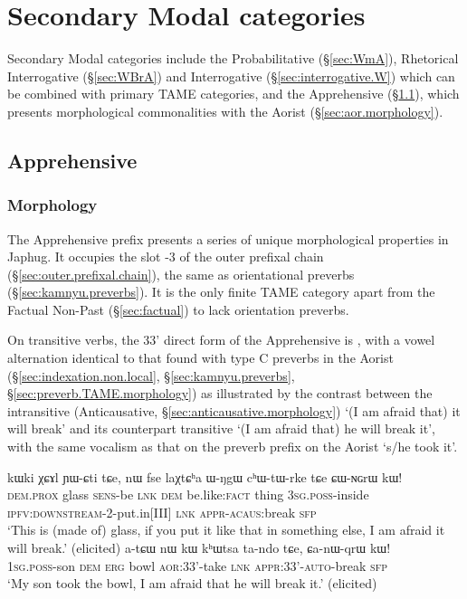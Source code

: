  
\section{Secondary Modal categories}  \label{sec:second.modal}
Secondary Modal categories include the Probabilitative (§\ref{sec:WmA}), Rhetorical Interrogative (§\ref{sec:WBrA}) and Interrogative (§\ref{sec:interrogative.W}) which can be combined with primary TAME categories, and the Apprehensive (§\ref{sec:apprehensive}), which presents morphological commonalities with the Aorist (§\ref{sec:aor.morphology}).

  \subsection{Apprehensive} \label{sec:apprehensive}
  
    \subsubsection{Morphology} \label{sec:apprehensive.morphology}
The Apprehensive prefix  presents a series of unique morphological properties in Japhug. It occupies the slot -3 of the outer prefixal chain (§\ref{sec:outer.prefixal.chain}), the same as orientational preverbs (§\ref{sec:kamnyu.preverbs}). It is the only finite TAME category apart from the Factual Non-Past (§\ref{sec:factual}) to lack orientation preverbs.

On transitive verbs, the 3\fl{}3' direct form of the Apprehensive is , with a vowel alternation identical to that found with type C preverbs in the Aorist (§\ref{sec:indexation.non.local}, §\ref{sec:kamnyu.preverbs}, §\ref{sec:preverb.TAME.morphology}) as illustrated by the contrast between the intransitive (Anticausative, §\ref{sec:anticausative.morphology})  `(I am afraid that) it will break' and its counterpart transitive  `(I am afraid that) he will break it', with the same vocalism as that on the preverb  prefix on the Aorist   `s/he took it'.

\begin{exe}
\ex \label{ex:NGrW.qrW}
\begin{xlist}
\ex \label{ex:CWNGrW}
\gll kɯki χɕɤl ɲɯ-ɕti tɕe, nɯ fse laχtɕʰa ɯ-ŋgɯ cʰɯ-tɯ-rke tɕe ɕɯ-ɴɢrɯ kɯ!  \\
\textsc{dem}.\textsc{prox} glass \textsc{sens}-be \textsc{lnk} \textsc{dem} be.like:\textsc{fact}  thing \textsc{3sg}.\textsc{poss}-inside \textsc{ipfv}:\textsc{downstream}-2-put.in[III] \textsc{lnk} \textsc{appr}-\textsc{acaus}:break \textsc{sfp} \\
\glt `This is (made of) glass, if you put it like that in something else, I am afraid it will break.' (elicited)
\ex \label{ex:CanWqrW}
\gll a-tɕɯ nɯ kɯ kʰɯtsa ta-ndo tɕe, ɕa-nɯ-qrɯ kɯ! \\
\textsc{1sg}.\textsc{poss}-son \textsc{dem} \textsc{erg} bowl \textsc{aor}:3\fl{}3'-take \textsc{lnk} \textsc{appr}:3\fl{}3'-\textsc{auto}-break \textsc{sfp} \\
\glt `My son took the bowl, I am afraid that he will break it.' (elicited)
\end{xlist}
 \end{exe}
 
